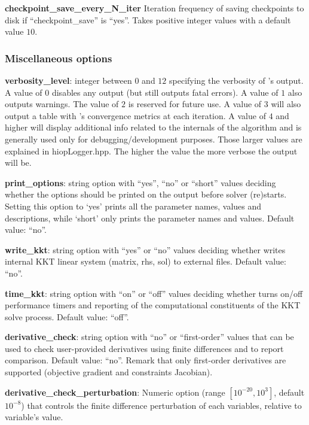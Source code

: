 \noindent \textbf{checkpoint\_save\_every\_N\_iter} Iteration frequency of saving checkpoints to disk if ``checkpoint\_save'' is ``yes''. Takes positive integer values with a default value $10$.


\subsubsection{Miscellaneous options}

\noindent \textbf{verbosity\_level}: integer between $0$ and $12$ specifying the verbosity of \Hi's output. A value of $0$ disables any output (but still outputs fatal errors). A value of $1$ also outputs warnings. The value of $2$ is reserved for future use. A value of $3$ will also output a table with \Hi's convergence metrics at each iteration. A value of $4$ and higher will display additional info related to the internals of the algorithm and is generally used only for debugging/development purposes. Those larger values are explained in hiopLogger.hpp. The higher the value the more verbose the output will be.
\medskip

\noindent \textbf{print\_options}: string option with ``yes'', ``no'' or ``short'' values deciding whether the options should be printed on the output before solver (re)starts. Setting this option to `yes' prints all the parameter names, values and descriptions, while `short' only prints the parameter names and values. Default value: ``no''.
\medskip

\noindent \textbf{write\_kkt}: string option with ``yes'' or ``no'' values deciding whether \Hi writes internal KKT linear system (matrix, rhs, sol) to external files. Default value: ``no''.
\medskip

\noindent \textbf{time\_kkt}: string option with ``on'' or ``off'' values deciding whether \Hi turns on/off performance timers and reporting of the computational constituents of the KKT solve process. Default value: ``off''.
\medskip

\noindent \textbf{derivative\_check}: string option with ``no'' or ``first-order'' values that can be used to check user-provided derivatives using finite differences and to report comparison.  Default value: ``no''. Remark that only first-order derivatives are supported (objective gradient and constraints Jacobian).
\medskip

\noindent \textbf{derivative\_check\_perturbation}: Numeric option (range $[10^{-20}, 10^{3}]$, default $10^{-8}$) that controls the finite difference perturbation of each variables, relative to variable's value.
\medskip
  
